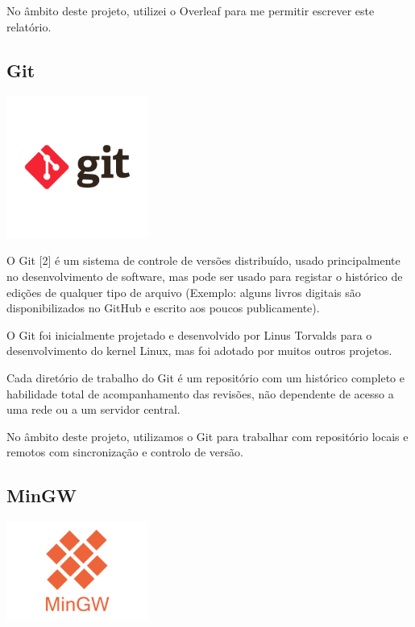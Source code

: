 \documentclass[a4paper,12pt]{article}
\begin{document}
No âmbito deste projeto, utilizei o Overleaf para me permitir escrever este relatório.

\newpage

\subsection{Git}
    \includegraphics[width=0.35\textwidth]{git.png} %
    \vspace{0.5cm}

O Git [2] é um sistema de controle de versões distribuído, usado principalmente no desenvolvimento de software, mas pode ser usado para registar o histórico de edições de qualquer tipo de arquivo (Exemplo: alguns livros digitais são disponibilizados no GitHub e escrito aos poucos publicamente).

O Git foi inicialmente projetado e desenvolvido por Linus Torvalds para o desenvolvimento do kernel Linux, mas foi adotado por muitos outros projetos.

Cada diretório de trabalho do Git é um repositório com um histórico completo e habilidade total de acompanhamento das revisões, não dependente de acesso a uma rede ou a um servidor central.

No âmbito deste projeto, utilizamos o Git para trabalhar com repositório locais e remotos com sincronização e controlo de versão.

\subsection{MinGW}
    \includegraphics[width=0.35\textwidth]{mingw.png} %
    \vspace{0.5cm}
\end{document}
